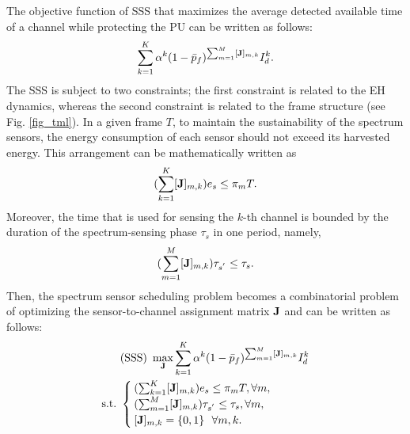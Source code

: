 \documentclass[journal]{IEEEtran} \ifCLASSINFOpdf
\begin{document}
The objective function of SSS that maximizes the average detected available time of a channel while protecting the PU can be written as follows:
\begin{equation}
\label{SSS-objective}
\sum_{k=1}^K \alpha^k (1-\bar{p}_f)^{\sum_{m=1}^M [{\bf J}]_{m,k}} I_d^k.
\end{equation}
The SSS is subject to two constraints; the first constraint is related to the EH dynamics, whereas the second constraint is related to the frame structure (see Fig. \ref{fig_tml}). In a given frame $T$, to maintain the sustainability of the spectrum sensors, the energy consumption of each sensor should not exceed its harvested energy. This arrangement can be mathematically written as
\begin{equation} \label{CE_power}
(\sum_{k=1}^{K} [{\bf{J}}]_{m,k}) e_s \leq \pi_m T.
\end{equation}
Moreover, the time that is used for sensing the $k$-th channel is bounded by the duration of the spectrum-sensing phase $\tau_s$ in one period, namely,
\begin{equation} \label{CE_time}
(\sum_{m=1}^{M} [{\bf J}]_{m,k}) \tau_{s^{'}} \leq \tau_s.
\end{equation}
Then, the spectrum sensor scheduling problem becomes a combinatorial problem of optimizing the sensor-to-channel assignment matrix $\bf{J}$ and can be written as follows:
\begin{align*}
\label{SSS-Problem}
&(\mbox{SSS})~ \max_{\bf{J}} \sum_{k=1}^K \alpha^k (1-\bar{p}_f)^{\sum_{m=1}^M [{\bf J}]_{m,k}} I_d^k    \\ \nonumber {\rm s.t.}~ &\begin{cases}
(\sum_{k=1}^{K} [{\bf J}]_{m,k}) e_s \leq \pi_m T,  \forall m,\\
(\sum_{m=1}^{M} [{\bf J}]_{m,k}) \tau_{s^{'}} \leq \tau_s, \forall m,\\
  [{\bf J}]_{m, k}= \{0 , 1\} ~~\forall m, k.
\end{cases}
\end{align*}
\end{document}

